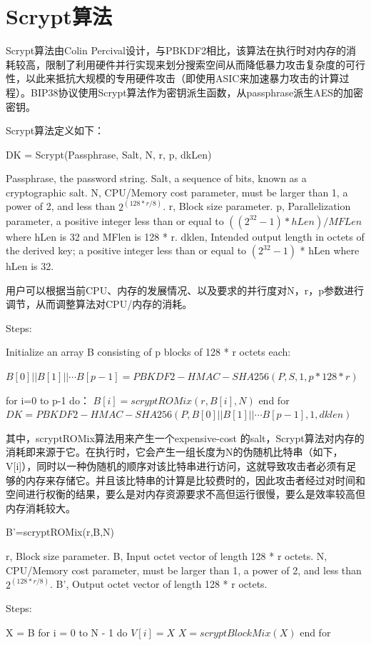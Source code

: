 \documentclass{article}
\begin{document}
\section{Scrypt算法}
Scrypt算法由Colin Percival设计，与PBKDF2相比，该算法在执行时对内存的消耗较高，限制了利用硬件并行实现来划分搜索空间从而降低暴力攻击复杂度的可行性，以此来抵抗大规模的专用硬件攻击（即使用ASIC来加速暴力攻击的计算过程）。BIP38协议使用Scrypt算法作为密钥派生函数，从passphrase派生AES的加密密钥。 
 
Scrypt算法定义如下：

DK = Scrypt(Passphrase, Salt, N, r, p, dkLen)  

Passphrase, the password string.
Salt, a sequence of bits, known as a cryptographic salt.
N, CPU/Memory cost parameter, must be larger than 1, a power of 2, and less than $2^{(128 * r / 8)}$.
r, Block size parameter.
p, Parallelization parameter, a positive integer less than or equal to $((2^{32}-1) * hLen) / MFLen$ where hLen is 32 and MFlen is 128 * r.
dklen, Intended output length in octets of the derived key; a positive integer less than or equal to $(2^{32} - 1)$ * hLen where hLen is 32.

用户可以根据当前CPU、内存的发展情况、以及要求的并行度对N，r，p参数进行调节，从而调整算法对CPU/内存的消耗。

Steps:

Initialize an array B consisting of p blocks of 128 * r octets each:

$B[0]||B[1]||\cdots B[p-1]=PBKDF2-HMAC-SHA256(P,S,1,p*128*r)$

for i=0 to p-1 do：  
$B[i]= scryptROMix(r,B[i],N) $   
end for  
$DK=PBKDF2-HMAC-SHA256(P,B[0]||B[1]||\cdots B[p-1],1,dklen)$

其中，scryptROMix算法用来产生一个expensive-cost 的salt，Scrypt算法对内存的消耗即来源于它。在执行时，它会产生一组长度为N的伪随机比特串（如下，V[i]），同时以一种伪随机的顺序对该比特串进行访问，这就导致攻击者必须有足够的内存来存储它。并且该比特串的计算是比较费时的，因此攻击者经过对时间和空间进行权衡的结果，要么是对内存资源要求不高但运行很慢，要么是效率较高但内存消耗较大。

B'=scryptROMix(r,B,N)

r, Block size parameter.
B, Input octet vector of length 128 * r octets.
N, CPU/Memory cost parameter, must be larger than 1, a power of 2, and less than $2^(128 * r / 8)$.
B', Output octet vector of length 128 * r octets.
 
Steps:

X = B
for i = 0 to N - 1 do  
   $V[i]=X$  
   $X=scryptBlockMix(X)$  
 end for   
 
\end{document}
